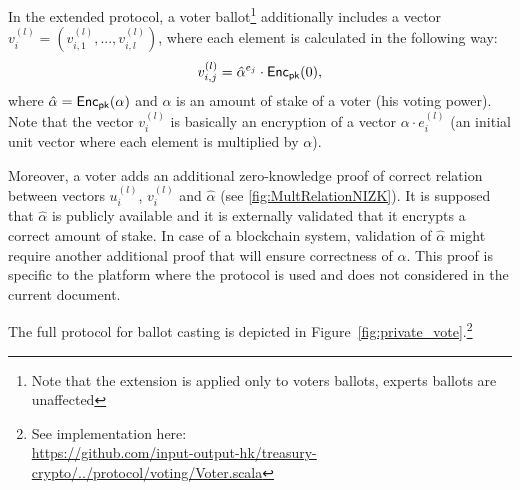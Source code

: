 In the extended protocol, a voter ballot\footnote{Note that the extension is applied only to voters ballots, experts ballots are unaffected} additionally includes a vector $v^{(l)}_i=(v^{(l)}_{i,1},...,v^{(l)}_{i,l})$, where each element is calculated in the following way:
\[v^{(l)}_{i,j}=\hat{\alpha}^{e_j}\cdot\mathsf{Enc}_{\mathsf{pk}}(0), \]
where $\hat{\alpha}=\mathsf{Enc}_{\mathsf{pk}}(\alpha)$ and $\alpha$ is an amount of stake of a voter (his voting power). Note that the vector $v^{(l)}_i$ is basically an encryption of a vector $\alpha \cdot e^{(l)}_i$ (an initial unit vector where each element is multiplied by $\alpha$).

Moreover, a voter adds an additional zero-knowledge proof of correct relation between vectors $u^{(l)}_i$, $v^{(l)}_i$ and $\hat\alpha$ (see \ref{fig:MultRelationNIZK}). It is supposed that $\hat\alpha$ is publicly available and it is externally validated that it encrypts  a correct amount of stake. In case of a blockchain system, validation of $\hat\alpha$ might require another additional proof that will ensure correctness of $\alpha$. This proof is specific to the platform where the protocol is used and does not considered in the current document.

The full protocol for ballot casting is depicted in Figure~\ref{fig:private_vote}.\footnote{See implementation here:\\ \href{https://github.com/input-output-hk/treasury-crypto/blob/master/src/main/scala/io/iohk/protocol/voting/Voter.scala}{https://github.com/input-output-hk/treasury-crypto/../protocol/voting/Voter.scala}}

